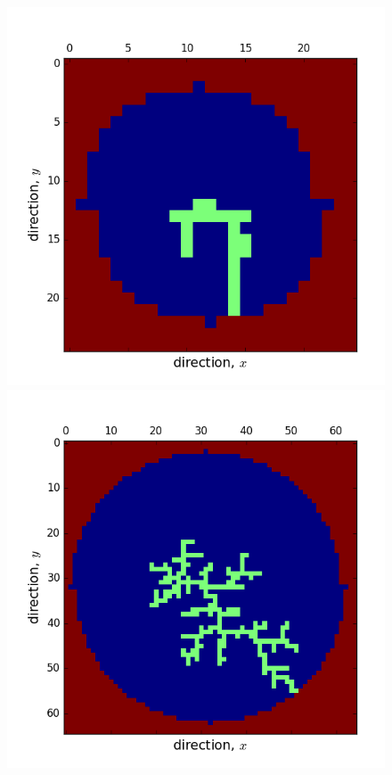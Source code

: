 \documentclass[12pt]{article}
\begin{document}
\begin{figure}[!htb]
  \includegraphics[width=\linewidth]{oneDLAcluster12run1.png}
  \caption{}\label{fig:dla1}
\endminipage\hfill
{}
  \includegraphics[width=\linewidth]{oneDLAcluster32run1.png}

\end{figure}
\end{document}
